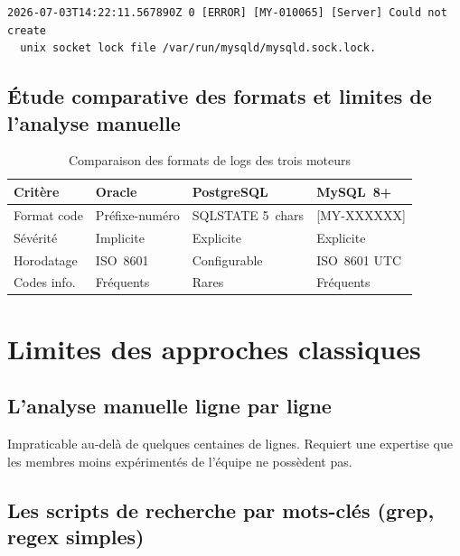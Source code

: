 \documentclass[12pt,a4paper]{report}
\begin{document}
\begin{lstlisting}[language={},caption={Extrait type d'un log MySQL~8},label=lst:alertlog_mysql]
2026-07-03T14:22:11.567890Z 0 [ERROR] [MY-010065] [Server] Could not create
  unix socket lock file /var/run/mysqld/mysqld.sock.lock.
\end{lstlisting}

\subsection{\'Etude comparative des formats et limites de l'analyse manuelle}

\begin{table}[H]
  \centering
  \caption{Comparaison des formats de logs des trois moteurs}
  \label{tab:compare_formats}
  \begin{tabularx}{\textwidth}{lXXX}
    \toprule
    \textbf{Crit\`ere} & \textbf{Oracle} & \textbf{PostgreSQL} & \textbf{MySQL~8+} \\
    \midrule
    Format code        & Pr\'efixe-num\'ero & SQLSTATE 5~chars & {[MY-XXXXXX]} \\
    S\'ev\'erit\'e     & Implicite & Explicite & Explicite \\
    Horodatage         & ISO~8601 & Configurable & ISO~8601 UTC \\
    Codes info.        & Fr\'equents & Rares & Fr\'equents \\
    \bottomrule
  \end{tabularx}
\end{table}

\section{Limites des approches classiques}

\subsection{L'analyse manuelle ligne par ligne}

Impraticable au-del\`a de quelques centaines de lignes. Requiert une expertise
que les membres moins exp\'eriment\'es de l'\'equipe ne poss\`edent pas.

\subsection{Les scripts de recherche par mots-cl\'es (grep, regex simples)}
\end{document}
